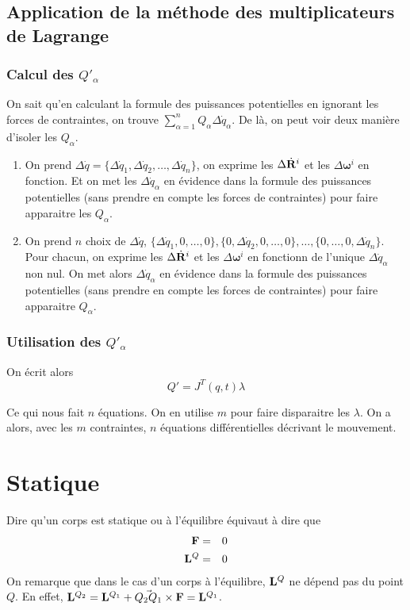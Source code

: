 \documentclass[11pt,a4paper]{article}
\newcommand\fv[1]{{\bf #1}} %
\newcommand\fvd[1]{\dot{\bf #1}} %
\newcommand\omegaf{{\bm \omega}}
\newcommand\st{{\bf L}}
\newcommand\xgd{\ensuremath{\fvd{R}}}
\newcommand\dqp{\Delta \dot{q}}
\begin{document}
\subsection{Application de la méthode des multiplicateurs de Lagrange}

\subsubsection{Calcul des $Q'_\alpha$}
On sait qu'en calculant la formule des puissances potentielles en ignorant les forces de contraintes,
on trouve $\sum_{\alpha = 1}^n Q_\alpha \dqp_\alpha$.
De là, on peut voir deux manière d'isoler les $Q_\alpha$.
\begin{enumerate}
	\item On prend $\dqp = \{\dqp_1, \dqp_2, \ldots, \dqp_n\}$, on exprime les $\Delta \xgd^i$ et les $\Delta \omegaf^i$ en fonction.
		Et on met les $\dqp_\alpha$ en évidence dans la formule des puissances potentielles (sans prendre en compte les forces de contraintes) pour faire apparaitre les $Q_\alpha$.
	\item On prend $n$ choix de $\dqp$, $\{\dqp_1, 0, \ldots, 0\}, \{0, \dqp_2, 0, \ldots, 0\}, \ldots, \{0, \ldots, 0, \dqp_n\}$.
		Pour chacun, on exprime les $\Delta \xgd^i$ et les $\Delta \omegaf^i$ en fonctionn de l'unique $\dqp_\alpha$ non nul.
		On met alors $\dqp_\alpha$ en évidence dans la formule des puissances potentielles (sans prendre en compte les forces de contraintes) pour faire apparaitre $Q_\alpha$.
\end{enumerate}

\subsubsection{Utilisation des $Q'_\alpha$}
On écrit alors
\[ Q' = J^T(q, t) \lambda \]

Ce qui nous fait $n$ équations.
On en utilise $m$ pour faire disparaitre les $\lambda$.
On a alors, avec les $m$ contraintes, $n$ équations différentielles décrivant le mouvement.

\section{Statique}

Dire qu'un corps est statique ou à l'équilibre équivaut à dire que
\begin{eqnarray*}
	\fv{F} &=& 0\\
	\st^Q &=& 0
\end{eqnarray*}
On remarque que dans le cas d'un corps à l'équilibre, $\st^Q$ ne dépend pas du point $Q$.
En effet, $\st^{Q_2} = \st^{Q_1} + \vec{Q_2Q_1} \times \fv{F} = \st^{Q_1}$.
\end{document}
